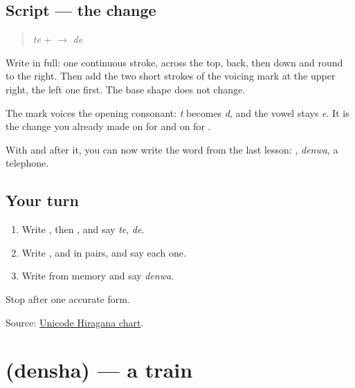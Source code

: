 \subsection*{Script — the change}

\begin{quote}
\textbf{} \emph{te} + \textbf{} $\to$ \textbf{} \emph{de}
\end{quote}

Write \textbf{} in full: one continuous stroke, across the top, back, then down and round to the right. Then add the two short strokes of the voicing mark at the upper right, the left one first. The base shape does not change.

The mark voices the opening consonant: \emph{t} becomes \emph{d}, and the vowel stays \emph{e}. It is the change you already made on \textbf{} for \textbf{} and on \textbf{} for \textbf{}.

With \textbf{} and \textbf{} after it, you can now write the word from the last lesson: \textbf{}, \emph{denwa}, a telephone.

\subsection*{Your turn}
\begin{enumerate}
\raggedright
  \item Write \textbf{}, then \textbf{}, and say \emph{te}, \emph{de}.
  \item Write \textbf{ }, \textbf{ } and \textbf{ } in pairs, and say each one.
  \item Write \textbf{} from memory and say \emph{denwa}.
\end{enumerate}

\begin{tcolorbox}[breakable,colback=teal!4,colframe=teal!35!black,title={Before you move on}]
Stop after one accurate form.

Source: \href{https://www.unicode.org/charts/PDF/U3040.pdf}{Unicode Hiragana chart}.
\end{tcolorbox}
\section[\texorpdfstring{\ja{でんしゃ} (densha)}{でんしゃ (densha)}]{ (densha) — a train}

